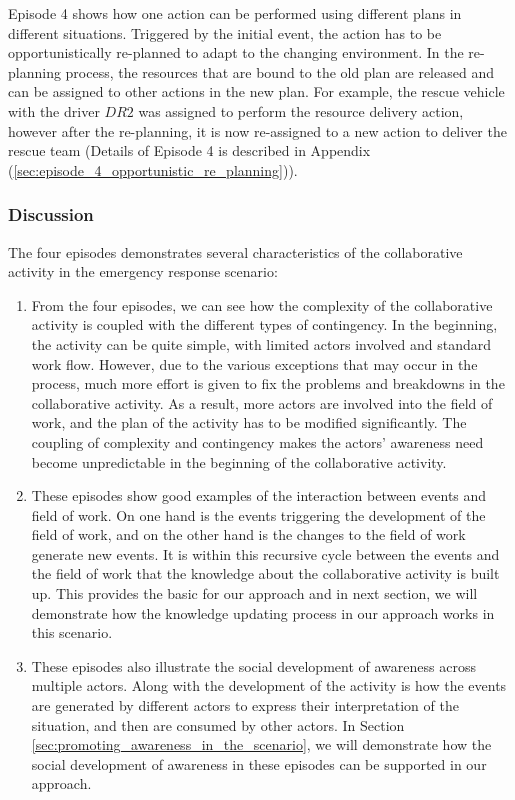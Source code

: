 Episode 4 shows how one action can be performed using different plans in different situations. Triggered by the initial event, the action has to be opportunistically re-planned to adapt to the changing environment. In the re-planning process, the resources that are bound to the old plan are released and can be assigned to other actions in the new plan. For example, the rescue vehicle with the driver $DR2$ was assigned to perform the resource delivery action, however after the re-planning, it is now re-assigned to a new action to deliver the rescue team (Details of Episode 4 is described in Appendix (\ref{sec:episode_4_opportunistic_re_planning})). 

\subsubsection{Discussion} %
\label{ssub:discussion}
The four episodes demonstrates several characteristics of the collaborative activity in the emergency response scenario:

\begin{enumerate}
	\item From the four episodes, we can see how the complexity of the collaborative activity is coupled with the different types of contingency. In the beginning, the activity can be quite simple, with limited actors involved and standard work flow. However, due to the various exceptions that may occur in the process, much more effort is given to fix the problems and breakdowns in the collaborative activity. As a result, more actors are involved into the field of work, and the plan of the activity has to be modified significantly. The coupling of complexity and contingency makes the actors' awareness need become unpredictable in the beginning of the collaborative activity.
	\item These episodes show good examples of the interaction between events and field of work. On one hand is the events triggering the development of the field of work, and on the other hand is the changes to the field of work generate new events. It is within this recursive cycle between the events and the field of work that the knowledge about the collaborative activity is built up. This provides the basic for our approach and in next section, we will demonstrate how the knowledge updating process in our approach works in this scenario. 
	\item These episodes also illustrate the social development of awareness across multiple actors. Along with the development of the activity is how the events are generated by different actors to express their interpretation of the situation, and then are consumed by other actors. In Section \ref{sec:promoting_awareness_in_the_scenario}, we will demonstrate how the social development of awareness in these episodes can be supported in our approach.
\end{enumerate}

